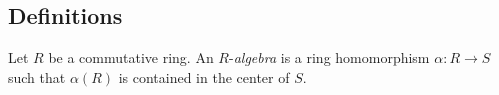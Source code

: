 \subsection{Definitions}

Let $R$ be a commutative ring. An $R$-\emph{algebra} is a ring homomorphism $\alpha : R \rightarrow S$
such that $\alpha(R)$ is contained in the center of $S$.